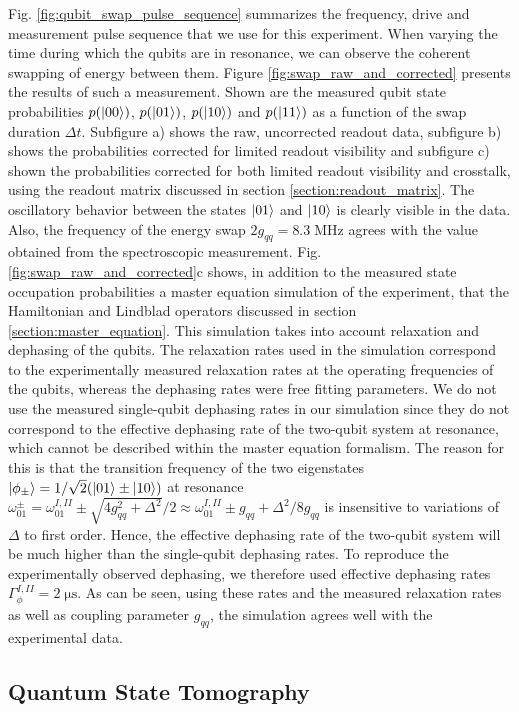 Fig. \ref{fig:qubit_swap_pulse_sequence} summarizes the frequency, drive and measurement pulse sequence that we use for this experiment. When varying the time during which the qubits are in resonance, we can observe the coherent swapping of energy between them. Figure \ref{fig:swap_raw_and_corrected} presents the results of such a measurement. Shown are the measured qubit state probabilities $p(\left| 00 \right>)$, $p(\left| 01 \right>)$, $p(\left| 10 \right>)$ and $p(\left| 11 \right>)$ as a function of the swap duration $\Delta t$. Subfigure a) shows the raw, uncorrected readout data, subfigure b) shows the probabilities corrected for limited readout visibility and subfigure c) shown the probabilities corrected for both limited readout visibility and crosstalk, using the readout matrix discussed in section \ref{section:readout_matrix}. The oscillatory behavior between the states $\left| 01 \right>$ and $\left| 10 \right>$ is clearly visible in the data. Also, the frequency of the energy swap $2g_{qq}=8.3\;\mathrm{MHz}$ agrees with the value obtained from the spectroscopic measurement. Fig. \ref{fig:swap_raw_and_corrected}c shows, in addition to the measured state occupation probabilities a master equation simulation of the experiment, that the Hamiltonian and Lindblad operators discussed in section \ref{section:master_equation}. This simulation takes into account relaxation and dephasing of the qubits. The relaxation rates used in the simulation correspond to the experimentally measured relaxation rates at the operating frequencies of the qubits, whereas the dephasing rates were free fitting parameters. We do not use the measured single-qubit dephasing rates in our simulation since they do not correspond to the effective dephasing rate of the two-qubit system at resonance, which cannot be described within the master equation formalism. The reason for this is that the transition frequency of the two eigenstates $\left| \phi_\pm \right>=1/\sqrt{2}(\left| 01 \right>\pm\left| 10 \right>)$ at resonance $\omega_{01}^{\pm}=\omega_{01}^{I,II}\pm\sqrt{4g_{qq}^2+\Delta^2}/2\approx \omega_{01}^{I,II}\pm g_{qq} +\Delta^2/8g_{qq}$ is insensitive to variations of $\Delta$ to first order. Hence, the effective dephasing rate of the two-qubit system will be much higher than the single-qubit dephasing rates. To reproduce the experimentally observed dephasing, we therefore used effective dephasing rates $\Gamma_\phi^{I,II}=2\;\mathrm{\mu s}$. As can be seen, using these rates and the measured relaxation rates as well as coupling parameter $g_{qq}$, the simulation agrees well with the experimental data.


\subsection{Quantum State Tomography}

